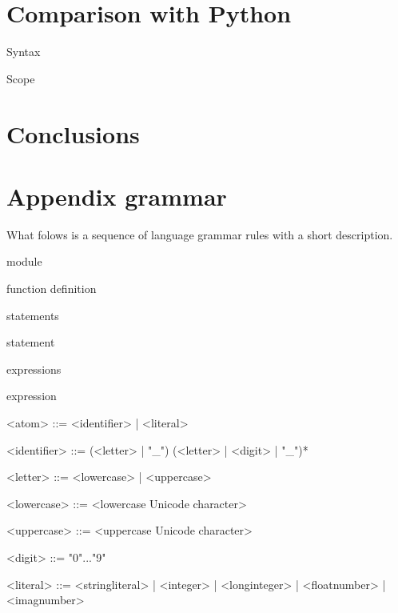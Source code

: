 \documentclass[10pt, a4paper]{article}
\begin{document}
\section{Comparison with Python}

Syntax

Scope

\section{Conclusions}

\section{Appendix grammar}

What folows is a sequence of language grammar rules with a short description.

module

function definition

statements

statement

expressions

expression

\begin{grammar}
<atom> ::= <identifier> | <literal>

<identifier> ::=  (<letter> | "_") (<letter> | <digit> | "_")*

<letter> ::=  <lowercase> | <uppercase>

<lowercase> ::=  <lowercase Unicode character>

<uppercase> ::=  <uppercase Unicode character>

<digit> ::=  "0"..."9"

<literal> ::=  <stringliteral> | <integer> | <longinteger> | <floatnumber> | <imagnumber>


\end{grammar}
\end{document}
